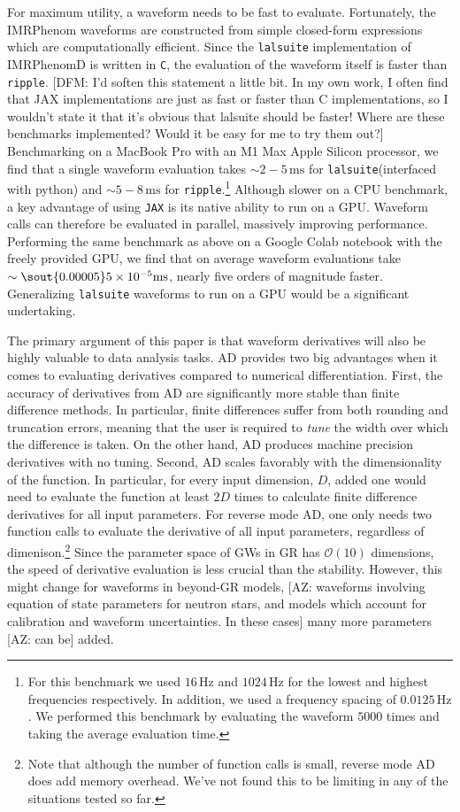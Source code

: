 \documentclass[twocolumn]{aastex631}
\newcommand{\jax}{\texttt{JAX}\xspace}
\newcommand{\ripple}{\texttt{ripple}\xspace}
\newcommand{\lalsuite}{\texttt{lalsuite}\xspace}
\newcommand{\AZ}[1]{{\color{Burnt}[AZ: #1]}}
\newcommand{\dfm}[1]{{\color{dfm}[DFM: #1]}}
\begin{document}
For maximum utility, a waveform needs to be fast to evaluate.
Fortunately, the IMRPhenom waveforms are constructed from simple closed-form expressions which are computationally efficient.
Since the \lalsuite implementation of IMRPhenomD is written in \texttt{C}, the evaluation of the waveform itself is faster than \ripple. \dfm{I'd soften this statement a little bit. In my own work, I often find that JAX implementations are just as fast or faster than C implementations, so I wouldn't state it that it's obvious that lalsuite should be faster! Where are these benchmarks implemented? Would it be easy for me to try them out?}
Benchmarking on a MacBook Pro with an M1 Max Apple Silicon processor, we find that a single waveform evaluation takes $\sim 2-5\,\mathrm{ms}$ for \lalsuite (interfaced with python) and $\sim 5-8\,\mathrm{ms}$ for \ripple.\footnote{
    For this benchmark we used $16\,\mathrm{Hz}$ and $1024\,\mathrm{Hz}$ for the lowest and highest frequencies respectively. 
    In addition, we used a frequency spacing of $0.0125\,\mathrm{Hz}$. 
    We performed this benchmark by evaluating the waveform $5000$ times and taking the average evaluation time.
}
Although slower on a CPU benchmark, a key advantage of using \jax is its native ability to run on a GPU.
Waveform calls can therefore be evaluated in parallel, massively improving performance.
Performing the same benchmark as above on a Google Colab notebook with the freely provided GPU, we find that on average waveform evaluations take $\sim \sout{0.00005} 5 \times 10^{-5}\mathrm{ms}$, nearly five orders of magnitude faster.
Generalizing \lalsuite waveforms to run on a GPU would be a significant undertaking.

The primary argument of this paper is that waveform derivatives will also be highly valuable to data analysis tasks. 
AD provides two big advantages when it comes to evaluating derivatives compared to numerical differentiation.
First, the accuracy of derivatives from AD are significantly more stable than finite difference methods.
In particular, finite differences suffer from both rounding and truncation errors, meaning that the user is required to \textit{tune} the width over which the difference is taken.
On the other hand, AD produces machine precision derivatives with no tuning.
Second, AD scales favorably with the dimensionality of the function.
In particular, for every input dimension, $D$, added one would need to evaluate the function at least $2D$ times to calculate finite difference derivatives for all input parameters.
For reverse mode AD, one only needs two function calls to evaluate the derivative of all input parameters, regardless of dimenison.\footnote{
    Note that although the number of function calls is small, reverse mode AD does add memory overhead.
    We've not found this to be limiting in any of the situations tested so far.
}
Since the parameter space of GWs in GR has $\mathcal{O}(10)$ dimensions, the speed of derivative evaluation is less crucial than the stability.
However, this might change for waveforms in beyond-GR models, \AZ{waveforms involving equation of state parameters for neutron stars, and models which account for calibration and waveform uncertainties.
In these cases} many more parameters \AZ{can be} added.
\end{document}
